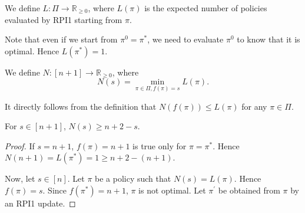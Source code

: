 \begin{appendices}

\begin{definition}
    We define $L:\Pi\to \mathbb{R}_{\ge 0}$, where $L(\pi)$ is the expected number of policies evaluated by RPI1 starting from $\pi$.
\end{definition}
Note that even if we start from $\pi^0=\pi^{*}$, we need to evaluate $\pi^0$ to know that it is optimal. Hence $L(\pi^{*})=1$.
\begin{definition}
    We define $N:[n+1]\to \mathbb{R}_{\ge 0}$, where $$N(s) = \min_{\pi\in\Pi, f(\pi)= s} L(\pi).$$
\end{definition}
It directly follows from the definition that $N(f(\pi))\le L(\pi)$ for any $\pi\in\Pi$.
\begin{theorem}
	For $s\in [n+1]$, $N(s) \ge n+2-s$.
\end{theorem}
\begin{proof}
If $s=n+1$, $f(\pi)= n+1$ is true only for $\pi=\pi^*$. Hence $N(n+1)=L(\pi^{*})=1\ge n+2-(n+1)$.

Now, let $s\in [n]$. Let $\pi$ be a policy such that $N(s)=L(\pi)$. Hence $f(\pi)=s$. Since $f(\pi^{*})=n+1$, $\pi$ is not optimal. Let $\pi^{\prime}$ be obtained from $\pi$ by an RPI1 update.


\end{proof}
\end{appendices}
